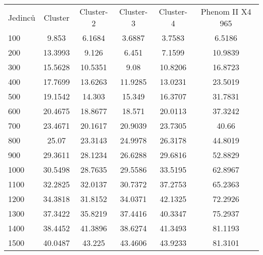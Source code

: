 \documentclass[12pt]{article}
\begin{document}
\begin{table}[H]
	\begin{tabular}{lccccc}
		Jedinců & Cluster & Cluster-2 & Cluster-3 & Cluster-4 & Phenom II X4 965 \\
		100     & 9.853   & 6.1684    & 3.6887    & 3.7583    & 6.5186           \\
		200     & 13.3993 & 9.126     & 6.451     & 7.1599    & 10.9839          \\
		300     & 15.5628 & 10.5351   & 9.08      & 10.8206   & 16.8723          \\
		400     & 17.7699 & 13.6263   & 11.9285   & 13.0231   & 23.5019          \\
		500     & 19.1542 & 14.303    & 15.349    & 16.3707   & 31.7831          \\
		600     & 20.4675 & 18.8677   & 18.571    & 20.0113   & 37.3242          \\
		700     & 23.4671 & 20.1617   & 20.9039   & 23.7305   & 40.66            \\
		800     & 25.07   & 23.3143   & 24.9978   & 26.3178   & 44.8019          \\
		900     & 29.3611 & 28.1234   & 26.6288   & 29.6816   & 52.8829          \\
		1000    & 30.5498 & 28.7635   & 29.5586   & 33.5195   & 62.8967          \\
		1100    & 32.2825 & 32.0137   & 30.7372   & 37.2753   & 65.2363          \\
		1200    & 34.3818 & 31.8152   & 34.0371   & 42.1325   & 72.2926          \\
		1300    & 37.3422 & 35.8219   & 37.4416   & 40.3347   & 75.2937          \\
		1400    & 38.4452 & 41.3896   & 38.6274   & 41.3493   & 81.1193          \\
		1500    & 40.0487 & 43.225    & 43.4606   & 43.9233   & 81.3101         
	\end{tabular}
	\label{tbl:benchmark}
\end{table}
\end{document}
